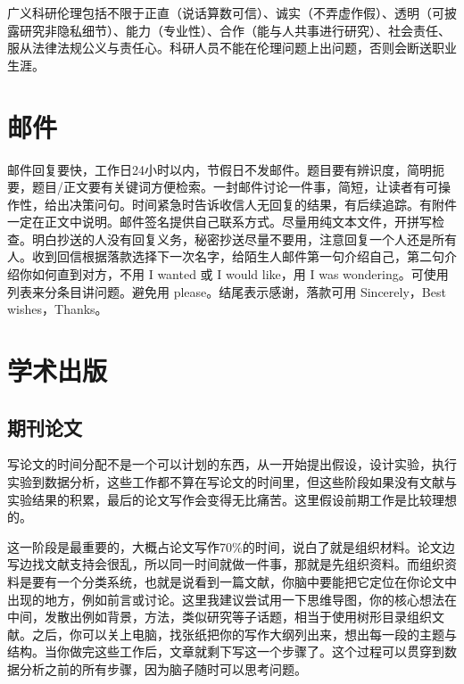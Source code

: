 \documentclass[]{tufte-book}
\begin{document}
广义科研伦理包括不限于正直（说话算数可信）、诚实（不弄虚作假）、透明（可披露研究非隐私细节）、能力（专业性）、合作（能与人共事进行研究）、社会责任、服从法律法规公义与责任心。科研人员不能在伦理问题上出问题，否则会断送职业生涯。

\hypertarget{ux90aeux4ef6}{%
\section{邮件}\label{ux90aeux4ef6}}

邮件回复要快，工作日24小时以内，节假日不发邮件。题目要有辨识度，简明扼要，题目/正文要有关键词方便检索。一封邮件讨论一件事，简短，让读者有可操作性，给出决策问句。时间紧急时告诉收信人无回复的结果，有后续追踪。有附件一定在正文中说明。邮件签名提供自己联系方式。尽量用纯文本文件，开拼写检查。明白抄送的人没有回复义务，秘密抄送尽量不要用，注意回复一个人还是所有人。收到回信根据落款选择下一次名字，给陌生人邮件第一句介绍自己，第二句介绍你如何直到对方，不用 I wanted 或 I would like，用 I was wondering。可使用列表来分条目讲问题。避免用 please。结尾表示感谢，落款可用 Sincerely，Best wishes，Thanks。

\hypertarget{ux5b66ux672fux51faux7248}{%
\section{学术出版}\label{ux5b66ux672fux51faux7248}}

\hypertarget{ux671fux520aux8bbaux6587}{%
\subsection{期刊论文}\label{ux671fux520aux8bbaux6587}}

写论文的时间分配不是一个可以计划的东西，从一开始提出假设，设计实验，执行实验到数据分析，这些工作都不算在写论文的时间里，但这些阶段如果没有文献与实验结果的积累，最后的论文写作会变得无比痛苦。这里假设前期工作是比较理想的。

这一阶段是最重要的，大概占论文写作70\%的时间，说白了就是组织材料。论文边写边找文献支持会很乱，所以同一时间就做一件事，那就是先组织资料。而组织资料是要有一个分类系统，也就是说看到一篇文献，你脑中要能把它定位在你论文中出现的地方，例如前言或讨论。这里我建议尝试用一下思维导图，你的核心想法在中间，发散出例如背景，方法，类似研究等子话题，相当于使用树形目录组织文献。之后，你可以关上电脑，找张纸把你的写作大纲列出来，想出每一段的主题与结构。当你做完这些工作后，文章就剩下写这一个步骤了。这个过程可以贯穿到数据分析之前的所有步骤，因为脑子随时可以思考问题。
\end{document}
